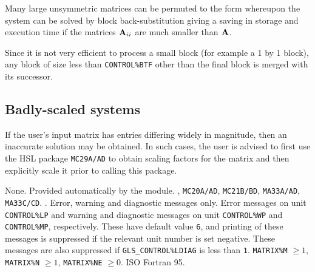 \documentclass{galahad}
\newcommand{\packagename}{GLS}
\begin{document}
Many large unsymmetric matrices can be permuted to the form
\noindent whereupon the system
can be solved by block back-substitution
giving a saving in storage and execution time if the matrices ${\mathbf{A}}_{ii}$
are much smaller than ${\mathbf{A}}$.

\noindent Since it is not very efficient to process a small block (for example
a {1 by 1} block), any block of size less than {\tt CONTROL\%BTF} other than the
final block is merged with its successor.

\subsection{Badly-scaled systems}

If the user's input matrix has entries differing widely in
magnitude, then an inaccurate solution may be obtained. In such cases,
the user is advised to first use the HSL package {\tt MC29A/AD} to
obtain scaling factors for the matrix and then explicitly scale it prior
to calling this package.


\galgeneral

\galcommon None.
\galworkspace Provided automatically by the module.
,
{\tt MC20A/AD}, {\tt MC21B/BD}, {\tt MA33A/AD}, {\tt MA33C/CD}.
.
\galio
Error, warning and diagnostic messages only.  Error messages on unit
{\tt CONTROL\%LP} and warning and diagnostic messages on unit
{\tt CONTROL\%WP} and {\tt CONTROL\%MP}, respectively.  These have default
value {\tt 6}, and printing of these messages is suppressed if the
relevant unit number is set negative.  These messages are also
suppressed if {\tt \packagename\_CONTROL\%LDIAG} is less than {\tt 1}.
\galrestrictions
{\tt MATRIX\%M} $\geq 1$, {\tt MATRIX\%N} $\geq 1$, {\tt MATRIX\%NE} $\geq 0$.
\galportability ISO Fortran 95.
\end{document}
